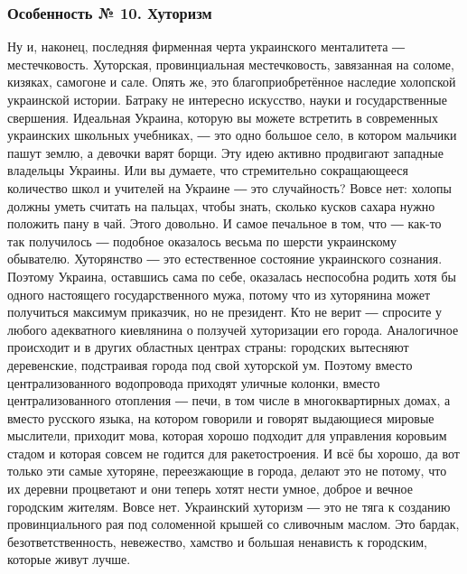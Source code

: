 \subsubsection{Особенность № 10. Хуторизм}

Ну и, наконец, последняя фирменная черта украинского менталитета ―
местечковость. Хуторская, провинциальная местечковость, завязанная на соломе,
кизяках, самогоне и сале. Опять же, это благоприобретённое наследие холопской
украинской истории. Батраку не интересно искусство, науки и государственные
свершения. Идеальная Украина, которую вы можете встретить в современных
украинских школьных учебниках, ― это одно большое село, в котором мальчики
пашут землю, а девочки варят борщи. Эту идею активно продвигают западные
владельцы Украины. Или вы думаете, что стремительно сокращающееся количество
школ и учителей на Украине ― это случайность? Вовсе нет: холопы должны уметь
считать на пальцах, чтобы знать, сколько кусков сахара нужно положить пану в
чай. Этого довольно. И самое печальное в том, что ― как-то так получилось ―
подобное оказалось весьма по шерсти украинскому обывателю. Хуторянство ― это
естественное состояние украинского сознания. Поэтому Украина, оставшись сама по
себе, оказалась неспособна родить хотя бы одного настоящего государственного
мужа, потому что из хуторянина может получиться максимум приказчик, но не
президент. Кто не верит ― спросите у любого адекватного киевлянина о ползучей
хуторизации его города. Аналогичное происходит и в других областных центрах
страны: городских вытесняют деревенские, подстраивая города под свой хуторской
ум. Поэтому вместо централизованного водопровода приходят уличные колонки,
вместо централизованного отопления ― печи, в том числе в многоквартирных домах,
а вместо русского языка, на котором говорили и говорят выдающиеся мировые
мыслители, приходит мова, которая хорошо подходит для управления коровьим
стадом и которая совсем не годится для ракетостроения. И всё бы хорошо, да вот
только эти самые хуторяне, переезжающие в города, делают это не потому, что их
деревни процветают и они теперь хотят нести умное, доброе и вечное городским
жителям. Вовсе нет. Украинский хуторизм ― это не тяга к созданию
провинциального рая под соломенной крышей со сливочным маслом. Это бардак,
безответственность, невежество, хамство и большая ненависть к городским,
которые живут лучше.
